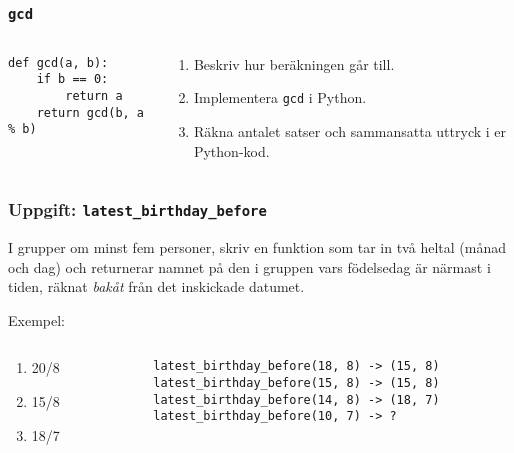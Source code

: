 \documentclass{beamer}
\begin{document}
  \begin{frame}[fragile]
    \frametitle{\texttt{gcd}}

    \begin{columns}
      \begin{column}{0.48\textwidth}
        \begin{verbatim}
def gcd(a, b):
    if b == 0:
        return a
    return gcd(b, a % b)
        \end{verbatim}
      \end{column}%
      \begin{column}{0.48\textwidth}
        \begin{enumerate}
          \item Beskriv hur beräkningen går till.
          \item Implementera \texttt{gcd} i Python.
          \item Räkna antalet satser och sammansatta uttryck i er Python-kod.
        \end{enumerate}
      \end{column}%
    \end{columns}
  \end{frame}

  \begin{frame}
    \frametitle{Uppgift: \texttt{latest\_birthday\_before}}

    I grupper om minst fem personer, skriv en funktion som tar in två heltal
    (månad och dag) och returnerar namnet på den i gruppen vars födelsedag är
    närmast i tiden, räknat \emph{bakåt} från det inskickade datumet.

    \pause
    \vspace{1em}

    Exempel:

    \begin{columns}[T]
      \begin{column}{0.2\textwidth}
        \begin{enumerate}
          \item 20/8
          \item 15/8
          \item 18/7
        \end{enumerate}
      \end{column}%
      \begin{column}{0.78\textwidth}
        \texttt{latest\_birthday\_before(18, 8) -> (15, 8)}\\
        \texttt{latest\_birthday\_before(15, 8) -> (15, 8)}\\
        \texttt{latest\_birthday\_before(14, 8) -> (18, 7)}\\
        \pause
        \texttt{latest\_birthday\_before(10, 7) -> ?}
      \end{column}%
    \end{columns}
  \end{frame}
\end{document}
